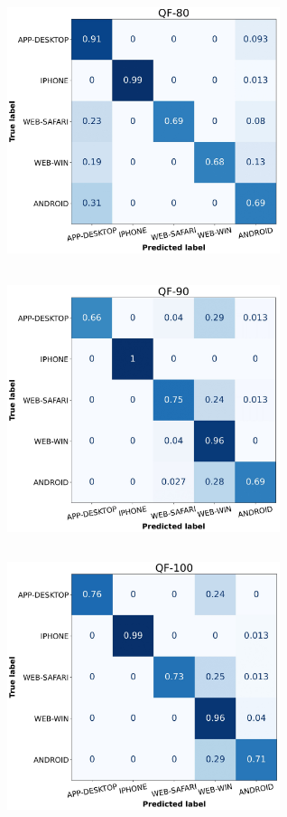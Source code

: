     \includegraphics[width=8cm, height=8cm, keepaspectratio]{Immagini/Classificazione/confusion_matrix_SVM_QF-80.jpg}\\\vspace{1em}
    \includegraphics[width=8cm, height=8cm, keepaspectratio]{Immagini/Classificazione/confusion_matrix_SVM_QF-90.jpg}\ \ \ \ \
    \includegraphics[width=8cm, height=8cm, keepaspectratio]{Immagini/Classificazione/confusion_matrix_SVM_QF-100.jpg}
    \label{fig:class_QF_SVM}
\endgroup

